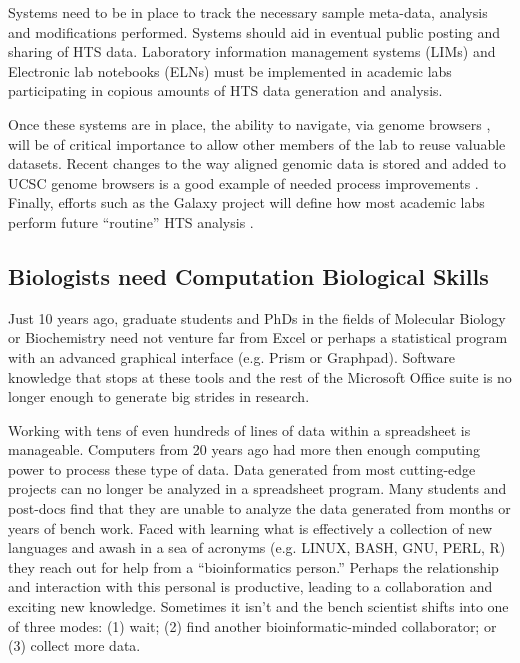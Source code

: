     Systems need to be in place to track the necessary sample meta-data, analysis and modifications performed. Systems should aid in eventual public posting and sharing of HTS data. Laboratory information management systems (LIMs) and Electronic lab notebooks (ELNs) must be implemented in academic labs participating in copious amounts of HTS data generation and analysis.

    Once these systems are in place, the ability to navigate, via genome browsers \citep{Zweig2008,Robinson2011}, will be of critical importance to allow other members of the lab to reuse valuable datasets. Recent changes to the way aligned genomic data is stored and added to UCSC genome browsers is a good example of needed process improvements \citep{Raney2013}. Finally, efforts such as the Galaxy project will define how most academic labs perform future ``routine'' HTS analysis \citep{Blankenberg2010}.

  \subsection{Biologists need Computation Biological Skills}
    \label{Disc:subsec:Biologists need Comp Skills}

    Just 10 years ago, graduate students and PhDs in the fields of Molecular Biology or Biochemistry need not venture far from Excel or perhaps a statistical program with an advanced graphical interface (e.g. Prism or Graphpad). Software knowledge that stops at these tools and the rest of the Microsoft Office suite is no longer enough to generate big strides in research.

    Working with tens of even hundreds of lines of data within a spreadsheet is manageable. Computers from 20 years ago had more then enough computing power to process these type of data. Data generated from most cutting-edge projects can no longer be analyzed in a spreadsheet program. Many students and post-docs find that they are unable to analyze the data generated from months or years of bench work. Faced with learning what is effectively a collection of new languages and awash in a sea of acronyms (e.g. LINUX, BASH, GNU, PERL, R) they reach out for help from a ``bioinformatics person.'' Perhaps the relationship and interaction with this personal is productive, leading to a collaboration and exciting new knowledge. Sometimes it isn't and the bench scientist shifts into one of three modes: (1) wait; (2) find another bioinformatic-minded collaborator; or (3) collect more data.

